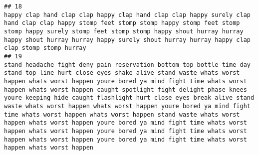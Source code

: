 \documentclass[]{article}
\begin{document}
\begin{verbatim}
## 18                                                                                                                                                                                                                                                                                                                                                                                                                                                                                                                                                                                                                                                                                                                                                                                                                                                                                                                              happy clap hand clap clap happy clap hand clap clap happy surely clap hand clap clap happy stomp feet stomp stomp happy stomp feet stomp stomp happy surely stomp feet stomp stomp happy shout hurray hurray happy shout hurray hurray happy surely shout hurray hurray happy clap clap stomp stomp hurray
## 19                                                                                                                                                                                                                                                                                                                                                                                                                                                                                             stand headache fight deny pain reservation bottom top bottle time day stand top line hurt close eyes shake alive stand waste whats worst happen whats worst happen youre bored ya mind fight time whats worst happen whats worst happen caught spotlight fight delight phase knees youre keeping hide caught flashlight hurt close eyes break alive stand waste whats worst happen whats worst happen youre bored ya mind fight time whats worst happen whats worst happen stand waste whats worst happen whats worst happen youre bored ya mind fight time whats worst happen whats worst happen youre bored ya mind fight time whats worst happen whats worst happen youre bored ya mind fight time whats worst happen whats worst happen

\end{verbatim}
\end{document}
